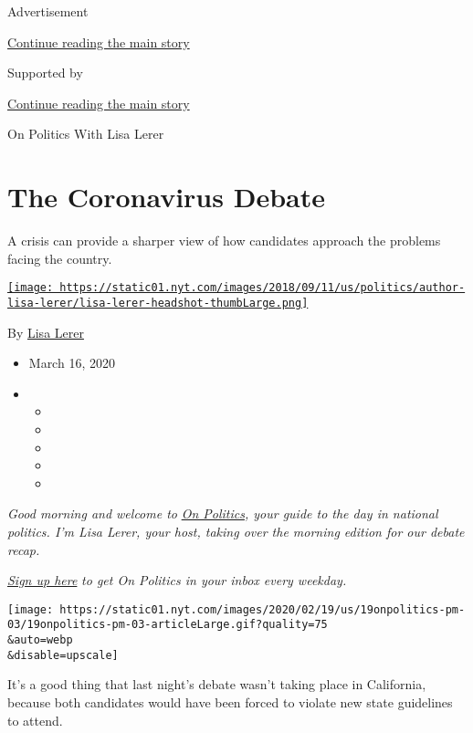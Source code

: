Advertisement

\protect\hyperlink{after-top}{Continue reading the main story}

Supported by

\protect\hyperlink{after-sponsor}{Continue reading the main story}

On Politics With Lisa Lerer

\hypertarget{the-coronavirus-debate}{%
\section{The Coronavirus Debate}\label{the-coronavirus-debate}}

A crisis can provide a sharper view of how candidates approach the
problems facing the country.

\href{https://www.nytimes.com/by/lisa-lerer}{\texttt{[image: https://static01.nyt.com/images/2018/09/11/us/politics/author-lisa-lerer/lisa-lerer-headshot-thumbLarge.png]}}

By \href{https://www.nytimes.com/by/lisa-lerer}{Lisa Lerer}

\begin{itemize}
\item
  March 16, 2020
\item
  \begin{itemize}
  \item
  \item
  \item
  \item
  \item
  \end{itemize}
\end{itemize}

\emph{Good morning and welcome to}
\href{https://www.nytimes.com/spotlight/on-politics}{\emph{On
Politics}}\emph{, your guide to the day in national politics. I'm Lisa
Lerer, your host, taking over the morning edition for our debate recap.}

\href{https://www.nytimes.com/newsletters/politics?module=inline}{\emph{Sign
up here}} \emph{to get On Politics in your inbox every weekday.}

\texttt{[image: https://static01.nyt.com/images/2020/02/19/us/19onpolitics-pm-03/19onpolitics-pm-03-articleLarge.gif?quality=75\\\&auto=webp\\\&disable=upscale]}

It's a good thing that last night's debate wasn't taking place in
California, because both candidates would have been forced to violate
new state guidelines to attend.

